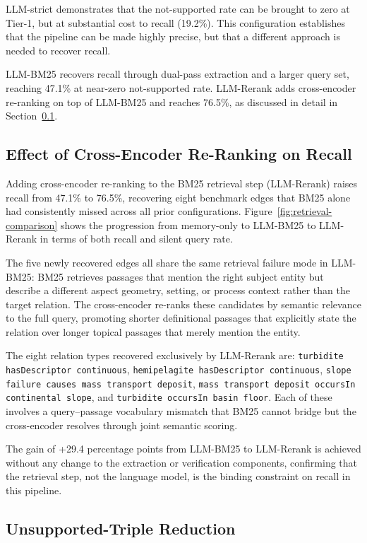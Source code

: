 \documentclass[10pt]{article}
\newcommand{\pred}[1]{\texttt{\small #1}}
\begin{document}
LLM-strict demonstrates that the not-supported rate can be brought to
zero at Tier-1, but at substantial cost to recall (19.2\%).
This configuration establishes that the pipeline can be made
highly precise, but that a different approach is needed to recover
recall.

LLM-BM25 recovers recall through dual-pass extraction and a larger
query set, reaching 47.1\% at near-zero not-supported rate.
LLM-Rerank adds cross-encoder re-ranking on top of LLM-BM25 and reaches
76.5\%, as discussed in detail in Section~\ref{sec:run11}.
\subsection{Effect of Cross-Encoder Re-Ranking on Recall}
\label{sec:run11}

Adding cross-encoder re-ranking to the BM25 retrieval
step (LLM-Rerank) raises recall from 47.1\% to 76.5\%,
recovering eight benchmark edges that BM25 alone had
consistently missed across all prior configurations.
Figure~\ref{fig:retrieval-comparison} shows the
progression from memory-only to LLM-BM25 to LLM-Rerank in terms
of both recall and silent query rate.

The five newly recovered edges all share the same
retrieval failure mode in LLM-BM25: BM25 retrieves passages
that mention the right subject entity but describe a
different aspect  geometry, setting, or process
context  rather than the target relation.
The cross-encoder re-ranks these candidates by
semantic relevance to the full query, promoting
shorter definitional passages that explicitly state
the relation over longer topical passages that merely
mention the entity.

The eight relation types recovered exclusively by LLM-Rerank
are: \pred{turbidite hasDescriptor continuous},
\pred{hemipelagite hasDescriptor continuous},
\pred{slope failure causes mass transport deposit},
\pred{mass transport deposit occursIn continental
slope}, and \pred{turbidite occursIn basin floor}.
Each of these involves a query--passage vocabulary
mismatch that BM25 cannot bridge but the cross-encoder
resolves through joint semantic scoring.

The gain of +29.4 percentage points from LLM-BM25 to LLM-Rerank
is achieved without any change to the extraction or
verification components, confirming that the retrieval
step, not the language model, is the binding constraint
on recall in this pipeline.
\subsection{Unsupported-Triple Reduction}
\label{sec:halluc-decomp}
\end{document}
